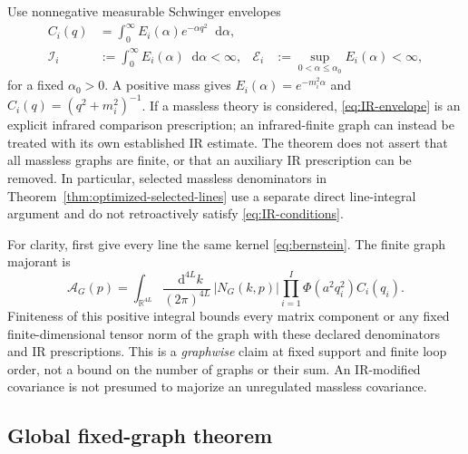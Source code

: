 \documentclass[final,5p,times,twocolumn,numbers,nopreprintline]{elsarticle}
\numberwithin{equation}{section}
\theoremstyle{definition}
\theoremstyle{remark}
\newcommand{\dd}{\mathop{}\!\mathrm d}
\newcommand{\Ph}{\Phi}
\newcommand{\RR}{\mathbb R}
\newcommand{\abs}[1]{\left\lvert #1\right\rvert}
\begin{document}
Use nonnegative measurable Schwinger envelopes
\begin{align}
 C_i(q)&=\int_0^\infty E_i(\alpha)e^{-\alpha q^2}\dd\alpha,
 \label{eq:IR-envelope}\\
 \mathcal I_i&:=\int_0^\infty E_i(\alpha)\dd\alpha<\infty,
 &\mathcal E_i&:=\sup_{0<\alpha\leq\alpha_0}E_i(\alpha)<\infty ,
 \label{eq:IR-conditions}
\end{align}
for a fixed \(\alpha_0>0\). A positive mass gives
\(E_i(\alpha)=e^{-m_i^2\alpha}\) and
\(C_i(q)=(q^2+m_i^2)^{-1}\).
If a massless theory is considered, \eqref{eq:IR-envelope} is an
explicit infrared comparison prescription; an infrared-finite graph
can instead be treated with its own established IR estimate.
The theorem does not assert that all massless graphs are finite,
or that an auxiliary IR prescription can be removed. In particular,
selected massless denominators in
Theorem~\ref{thm:optimized-selected-lines} use a separate direct
line-integral argument and do not retroactively satisfy
\eqref{eq:IR-conditions}.

For clarity, first give every line the same kernel
\eqref{eq:bernstein}. The finite graph majorant is
\begin{equation}
 \mathcal A_G(p)=\int_{\RR^{4L}}
 \frac{\dd^{4L}k}{(2\pi)^{4L}}\,
 \abs{N_G(k,p)}
 \prod_{i=1}^I \Ph(a^2q_i^2)C_i(q_i).
 \label{eq:graph-majorant}
\end{equation}
Finiteness of this positive integral bounds every matrix component
or any fixed finite-dimensional tensor norm of the graph with these
declared denominators and IR prescriptions. This is a \emph{graphwise}
claim at fixed support and finite loop order, not a bound on the number
of graphs or their sum. An IR-modified covariance is not presumed to
majorize an unregulated massless covariance.

\subsection{Global fixed-graph theorem}
\end{document}
